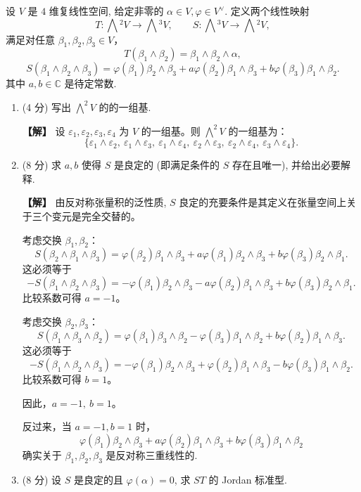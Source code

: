 设 $V$ 是 $4$ 维复线性空间, 给定非零的 $\alpha\in V,\varphi\in V^\vee$. 定义两个线性映射
\[T:\bigwedge{}^2V\to\bigwedge{}^3V,\qquad S:\bigwedge{}^3V\to\bigwedge{}^2V,\]
满足对任意 $\beta_1,\beta_2,\beta_3\in V$，
\[T(\beta_1\wedge\beta_2)=\beta_1\wedge\beta_2\wedge\alpha,\]
\[S(\beta_1\wedge\beta_2\wedge\beta_3)=\varphi(\beta_1)\beta_2\wedge\beta_3
+a\varphi(\beta_2)\beta_1\wedge\beta_3+b\varphi(\beta_3)\beta_1\wedge\beta_2.\]
其中 $a,b\in\mathbb{C}$ 是待定常数.
\begin{enumerate}
\item (4 分) 写出 $\bigwedge^2V$ 的的一组基.

\textbf{【解】} 设 $\varepsilon_1,\varepsilon_2,\varepsilon_3,\varepsilon_4$ 为 $V$ 的一组基。则 $\bigwedge^2V$ 的一组基为：
\[\{\varepsilon_1\wedge\varepsilon_2,\ \varepsilon_1\wedge\varepsilon_3,
\ \varepsilon_1\wedge\varepsilon_4,\ \varepsilon_2\wedge\varepsilon_3,
\ \varepsilon_2\wedge\varepsilon_4,\ \varepsilon_3\wedge\varepsilon_4\}.\]

\item (8 分) 求 $a,b$ 使得 $S$ 是良定的 (即满足条件的 $S$ 存在且唯一), 并给出必要解释.

\textbf{【解】} 由反对称张量积的泛性质, $S$ 良定的充要条件是其定义在张量空间上关于三个变元是完全交替的。

考虑交换 $\beta_1,\beta_2$：
\[S(\beta_2\wedge\beta_1\wedge\beta_3)=\varphi(\beta_2)\beta_1\wedge\beta_3
+a\varphi(\beta_1)\beta_2\wedge\beta_3+b\varphi(\beta_3)\beta_2\wedge\beta_1.\]
这必须等于
\[-S(\beta_1\wedge\beta_2\wedge\beta_3)=-\varphi(\beta_1)\beta_2\wedge\beta_3
-a\varphi(\beta_2)\beta_1\wedge\beta_3+b\varphi(\beta_3)\beta_2\wedge\beta_1.\]
比较系数可得 $a=-1$。

考虑交换 $\beta_2,\beta_3$：
\[S(\beta_1\wedge\beta_3\wedge\beta_2)=\varphi(\beta_1)\beta_3\wedge\beta_2
-\varphi(\beta_3)\beta_1\wedge\beta_2+b\varphi(\beta_2)\beta_1\wedge\beta_3.\]
这必须等于
\[-S(\beta_1\wedge\beta_2\wedge\beta_3)=-\varphi(\beta_1)\beta_2\wedge\beta_3
+\varphi(\beta_2)\beta_1\wedge\beta_3-b\varphi(\beta_3)\beta_1\wedge\beta_2.\]
比较系数可得 $b=1$。

因此，$a=-1,\ b=1$。

反过来，当 $a=-1,b=1$ 时，
\[\varphi(\beta_1)\beta_2\wedge\beta_3+a\varphi(\beta_2)\beta_1\wedge\beta_3+b\varphi(\beta_3)\beta_1\wedge\beta_2\]
确实关于 $\beta_1,\beta_2,\beta_3$ 是反对称三重线性的.

\item (8 分) 设 $S$ 是良定的且 $\varphi(\alpha)=0$, 求 $ST$ 的 Jordan 标准型.


\end{enumerate}
